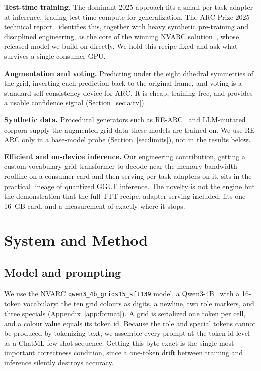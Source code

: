 \documentclass[11pt]{article}
\begin{document}
\textbf{Test-time training.} The dominant 2025 approach fits a small per-task adapter at inference,
trading test-time compute for generalization. The ARC Prize 2025 technical report~\cite{arc2025}
identifies this, together with heavy synthetic pre-training and disciplined engineering, as the core
of the winning NVARC solution~\cite{nvarc}, whose released model we build on directly. We hold this
recipe fixed and ask what survives a single consumer GPU.

\textbf{Augmentation and voting.} Predicting under the eight dihedral symmetries of the grid,
inverting each prediction back to the original frame, and voting is a standard self-consistency
device for ARC. It is cheap, training-free, and provides a usable confidence signal
(Section~\ref{sec:airv}).

\textbf{Synthetic data.} Procedural generators such as RE-ARC~\cite{rearc} and LLM-mutated corpora
supply the augmented grid data these models are trained on. We use RE-ARC only in a base-model
probe (Section~\ref{sec:limits}), not in the results below.

\textbf{Efficient and on-device inference.} Our engineering contribution, getting a custom-vocabulary
grid transformer to decode near the memory-bandwidth roofline on a consumer card and then serving
per-task adapters on it, sits in the practical lineage of quantized GGUF inference. The novelty is
not the engine but the demonstration that the full TTT recipe, adapter serving included, fits one
16~GB card, and a measurement of exactly where it stops.

\section{System and Method}
\label{sec:method}

\subsection{Model and prompting}
\label{sec:model}
We use the NVARC \texttt{qwen3\_4b\_grids15\_sft139} model, a Qwen3-4B~\cite{qwen3} with a 16-token
vocabulary: the ten grid colours as digits, a newline, two role markers, and three specials
(Appendix~\ref{app:format}). A grid is serialized one token per cell, and a colour value equals its
token id. Because the role and special tokens cannot be produced by tokenizing text, we assemble
every prompt at the token-id level as a ChatML few-shot sequence. Getting this byte-exact is the
single most important correctness condition, since a one-token drift between training and inference
silently destroys accuracy.
\end{document}
